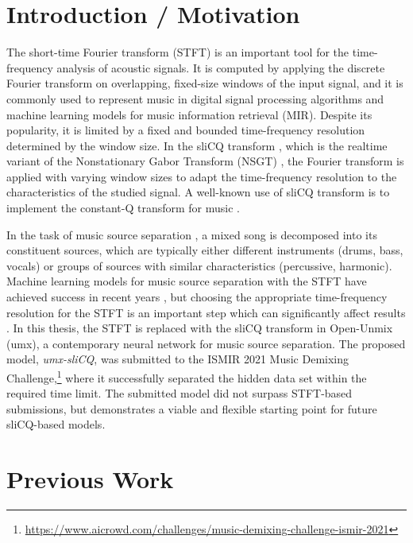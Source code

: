 \documentclass[letter,12pt]{article}
\title{\ThesisTitle}
\author{Sevag Hanssian, sevag.hanssian@mail.mcgill.ca}
\begin{document}
\maketitle

\section{Introduction / Motivation}

The short-time Fourier transform (STFT) is an important tool for the time-frequency analysis of acoustic signals. It is computed by applying the discrete Fourier transform on overlapping, fixed-size windows of the input signal, and it is commonly used to represent music in digital signal processing algorithms and machine learning models for music information retrieval (MIR). Despite its popularity, it is limited by a fixed and bounded time-frequency resolution determined by the window size. In the sliCQ transform \cite{invertiblecqt}, which is the realtime variant of the Nonstationary Gabor Transform (NSGT) \cite{balazs}, the Fourier transform is applied with varying window sizes to adapt the time-frequency resolution to the characteristics of the studied signal. A well-known use of sliCQ transform is to implement the constant-Q transform for music \cite{jbrown, klapuricqt}.

In the task of music source separation \cite{musicsepgood}, a mixed song is decomposed into its constituent sources, which are typically either different instruments (drums, bass, vocals) or groups of sources with similar characteristics (percussive, harmonic). Machine learning models for music source separation with the STFT have achieved success in recent years \cite{sisec2018}, but choosing the appropriate time-frequency resolution for the STFT is an important step which can significantly affect results \cite{tftradeoff1, tftradeoff2}. In this thesis, the STFT is replaced with the sliCQ transform in Open-Unmix (umx), a contemporary neural network \cite{umx} for music source separation. The proposed model, \textit{umx-sliCQ}, was submitted to the ISMIR 2021 Music Demixing Challenge,\footnote{\url{https://www.aicrowd.com/challenges/music-demixing-challenge-ismir-2021}} where it successfully separated the hidden data set within the required time limit. The submitted model did not surpass STFT-based submissions, but demonstrates a viable and flexible starting point for future sliCQ-based models.

\section{Previous Work}
\end{document}
